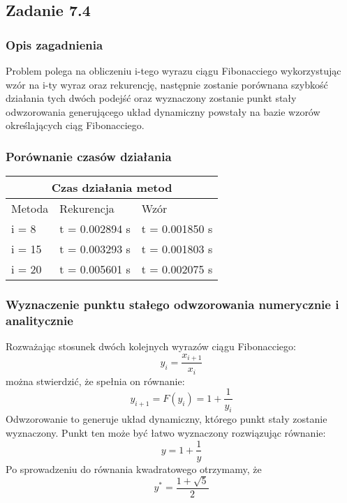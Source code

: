 \documentclass[a4paper,11pt]{article}
\begin{document}
\subsection{Zadanie 7.4}
\subsubsection{Opis zagadnienia}
Problem polega na obliczeniu i-tego wyrazu ciągu Fibonacciego wykorzystując wzór na i-ty wyraz oraz rekurencję, następnie zostanie porównana szybkość działania tych dwóch podejść oraz wyznaczony zostanie punkt stały odwzorowania generującego układ dynamiczny powstały na bazie wzorów określających ciąg Fibonacciego.
 
\subsubsection{Porównanie czasów działania}
\begin{table}[H]
\begin{center}
\begin{tabular}{|l|l|l|}
\hline
\multicolumn{3}{|c|}{\textbf{Czas działania metod}} \\ 
\hline 
Metoda &  Rekurencja  & Wzór \\ \hline
i = 8  & t = 0.002894 s  &  t = 0.001850 s \\ 
i = 15 & t = 0.003293 s  &  t = 0.001803 s \\
i = 20 & t = 0.005601 s  & t = 0.002075 s \\
\hline

\end{tabular}
\end{center}
\end{table}

\subsubsection{Wyznaczenie punktu stałego odwzorowania numerycznie i analitycznie}
Rozważając stosunek dwóch kolejnych wyrazów ciągu Fibonacciego:
\begin{equation*}
y_{i} = \frac{x_{i+1}}{x_{i}}
\end{equation*}
można stwierdzić, że spełnia on równanie: 
\begin{equation*}
y_{i+1}=F(y_{i})=1+\frac{1}{y_{i}}
\end{equation*}
Odwzorowanie to generuje układ dynamiczny, którego punkt stały zostanie wyznaczony. 
Punkt ten może być łatwo wyznaczony rozwiązując równanie:
\begin{equation*}
y = 1 +\frac{1}{y}
\end{equation*}
Po sprowadzeniu do równania kwadratowego otrzymamy, że
\begin{equation*}
y^{*}=\frac{1+\sqrt{5}}{2}
\end{equation*}
\end{document}
